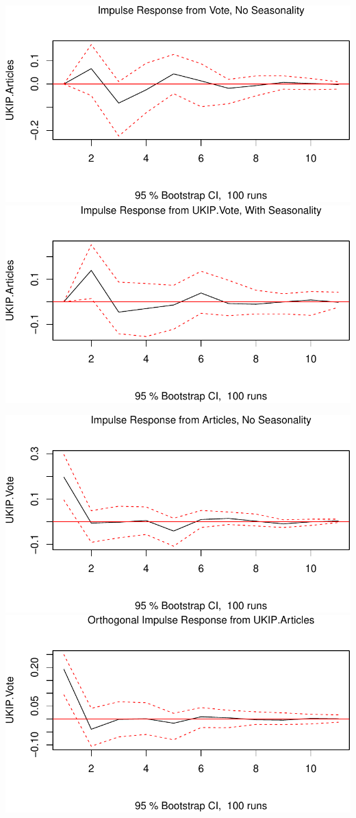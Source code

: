 \documentclass[12pt,article]{article}
\begin{document}
\includegraphics{ukip_media_files/figure-latex/unnamed-chunk-31.pdf}
\includegraphics{ukip_media_files/figure-latex/unnamed-chunk-32.pdf}

\includegraphics{ukip_media_files/figure-latex/unnamed-chunk-41.pdf}
\includegraphics{ukip_media_files/figure-latex/unnamed-chunk-42.pdf}
\end{document}
